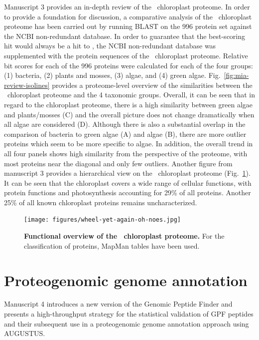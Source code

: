 Manuscript 3 provides an in-depth review of the \cre~chloroplast proteome.
In order to provide a foundation for discussion, a comparative analysis 
of the \cre~chloroplast proteome has been carried out by running BLAST
on the 996 protein set against the NCBI non-redundant database.
In order to guarantee that the best-scoring hit would always be a hit to
\cre, the NCBI non-redundant database was supplemented with the protein
sequences of the \cre~chloroplast proteome.
Relative bit scores for each of the 996 proteins were calculated for each of
the four groups: (1) bacteria, (2) plants and mosses, (3) algae, and (4) green 
algae.
Fig.~\ref{fig:mia-review-isolines} provides a proteome-level overview
of the similarities between the \cre~chloroplast proteome and the 4 taxonomic
groups.
Overall, it can be seen that in regard to the chloroplast proteome, there is
a high similarity between green algae and plants/mosses (C) and the overall
picture does not change dramatically when all algae are considered (D).
Although there is also a substantial overlap in the comparison of bacteria
to green algae (A) and algae (B), there are more outlier proteins which seem 
to be more specific to algae.
In addition, the overall trend in all four panels shows high similarity
from the perspective of the proteome, with most proteins near the diagonal
and only few outliers.
Another figure from manuscript 3 provides a hierarchical view on the
\cre~chloroplast proteome (Fig.~\ref{fig:mia-review-wheel}).
It can be seen that the chloroplast covers a wide range of cellular
functions, with protein functions and photosynthesis accounting for
29\% of all proteins.
Another 25\% of all known chloroplast proteins remains uncharacterized.

\begin{figure}
\texttt{[image: figures/wheel-yet-again-oh-noes.jpg]}
\caption{
    {\bf Functional overview of the \cre~chloroplast proteome.}
    For the classification of proteins, MapMan tables \cite{Thimm2004} 
    have been used.
}
\label{fig:mia-review-wheel}
\end{figure}

\section{Proteogenomic genome annotation}

Manuscript 4 introduces a new version of the Genomic Peptide Finder and
presents a high-throughput strategy for the statistical validation of
GPF peptides and their subsequent use in a proteogenomic genome annotation
approach using AUGUSTUS.


